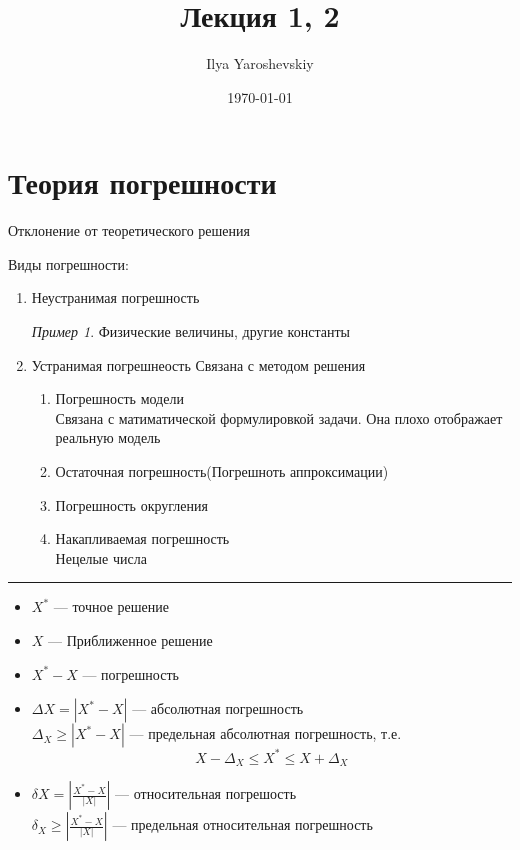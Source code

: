 \documentclass[english]{article}
\author{Ilya Yaroshevskiy}
\date{\today}
\title{Лекция 1, 2}
\theoremstyle{plain}
\theoremstyle{remark}
\newtheorem*{examp}{Пример}
\theoremstyle{definition}
\begin{document}
\maketitle
\tableofcontents


\section{Теория погрешности}
\label{sec:org549b6df}
\begin{defintion}
Отклонение от теоретического решения
\end{defintion}
Виды погрешности:
\begin{enumerate}
\item Неустранимая погрешность
\begin{examp}
Физические величины, другие константы
\end{examp}
\item Устранимая погрешнеость
Связана с методом решения
\begin{enumerate}
\item Погрешность модели \\
Связана с матиматической формулировкой задачи. Она плохо отображает реальную модель
\item Остаточная погрешность(Погрешноть аппроксимации)
\item Погрешность округления
\item Накапливаемая погрешность \\
Нецелые числа
\end{enumerate}
\end{enumerate}

\noindent\rule{\textwidth}{0.5pt}

\begin{itemize}
\item \(X^*\) --- точное решение \\
\item \(X\) --- Приближенное решение
\item \(X^* - X\) --- погрешность
\item \(\Delta X = |X^* - X|\) --- абсолютная погрешность \\
\(\Delta_X \ge |X^* - X|\) --- предельная абсолютная погрешность, т.е. \[ X - \Delta_X \le X^* \le X + \Delta_X \]
\item \(\delta X = \left|\frac{X^* - X}{|X|}\right|\) --- относительная погрешость \\
\(\delta_X \ge \left|\frac{X^* - X}{|X|}\right|\) --- предельная относительная погрешность
\end{itemize}
\end{document}
